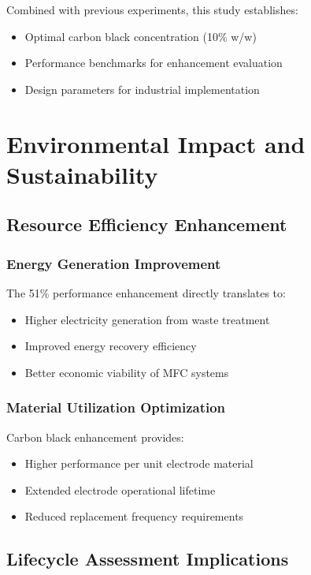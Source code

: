 \documentclass[12pt,a4paper]{article}
\begin{document}
Combined with previous experiments, this study establishes:
\begin{itemize}
    \item Optimal carbon black concentration (10\% w/w)
    \item Performance benchmarks for enhancement evaluation
    \item Design parameters for industrial implementation
\end{itemize}

\section{Environmental Impact and Sustainability}

\subsection{Resource Efficiency Enhancement}

\subsubsection{Energy Generation Improvement}

The 51\% performance enhancement directly translates to:
\begin{itemize}
    \item Higher electricity generation from waste treatment
    \item Improved energy recovery efficiency
    \item Better economic viability of MFC systems
\end{itemize}

\subsubsection{Material Utilization Optimization}

Carbon black enhancement provides:
\begin{itemize}
    \item Higher performance per unit electrode material
    \item Extended electrode operational lifetime
    \item Reduced replacement frequency requirements
\end{itemize}

\subsection{Lifecycle Assessment Implications}
\end{document}
